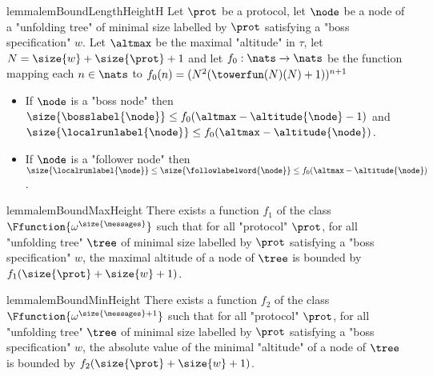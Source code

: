 \begin{restatable}{lemma}{lemBoundLengthHeightH}
	\label{lem:bound-length-at-height-h}
	Let $\prot$ be a protocol, let $\node$ be a node of a "unfolding tree" of minimal size labelled by $\prot$ satisfying a "boss specification" $w$.
	Let $\altmax$ be the maximal "altitude" in $\tau$, let $N = \size{w} + \size{\prot} +1$ and let $f_0 : \nats \to \nats$ be the function mapping each $n \in \nats$ to $f_0(n)=(N^2 (\towerfun(N)(N) + 1))^{n+1}$ 
	
	\begin{itemize}
		\item If $\node$ is a "boss node" then $\size{\bosslabel{\node}} \leq f_0(\altmax - \altitude{\node}-1)$ and $\size{\localrunlabel{\node}} \leq f_0(\altmax - \altitude{\node})$.
		
		\item If $\node$ is a "follower node" then $\size{\localrunlabel{\node}} \leq \size{\followlabelword{\node}} \leq  f_0(\altmax - \altitude{\node})$.
	\end{itemize} 
\end{restatable}

\begin{restatable}{lemma}{lemBoundMaxHeight}
	\label{lem:bound-max-height}
	There exists a function $f_1$ of the class $\Ffunction{\omega^{\size{\messages}}}$ such that for all "protocol" $\prot$, for all "unfolding tree" $\tree$ of minimal size labelled by $\prot$ satisfying a "boss specification" $w$, the maximal altitude of a node of $\tree$ is bounded by $f_1(\size{\prot} + \size{w}+1)$.
\end{restatable}


\begin{restatable}{lemma}{lemBoundMinHeight}
	\label{lem:bound-min-height}
	There exists a function $f_2$ of the class $\Ffunction{\omega^{\size{\messages}+1}}$ such that for all "protocol" $\prot$, for all "unfolding tree" $\tree$ of minimal size labelled by $\prot$ satisfying a "boss specification" $w$, the absolute value of the minimal "altitude" of a node of $\tree$ is bounded by $f_2(\size{\prot} + \size{w}+1)$.
\end{restatable}




